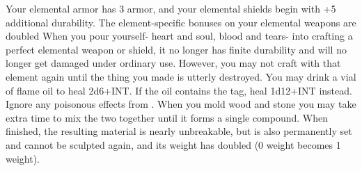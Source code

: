 \documentclass[darkmode]{dw_playbook}
\begin{document}
    {
            {Your elemental armor has 3 armor, and your elemental shields begin with +5 additional durability.}
        \gap
            {The element-specific bonuses on your elemental weapons are doubled}
        \gap
            {When you pour yourself- heart and soul, blood and tears- into crafting a perfect elemental weapon or shield, it no longer has finite durability and will no longer get damaged under ordinary use.  However, you may not craft with that element again until the thing you made is utterly destroyed.}
            {
            You may drink a vial of flame oil to heal 2d6+INT.  If the oil contains the  tag, heal 1d12+INT instead.  Ignore any poisonous effects from .}
        \gap
            {
            When you mold wood and stone you may take extra time to mix the two together until it forms a single compound.  When finished, the resulting material is nearly unbreakable, but is also permanently set and cannot be sculpted again, and its weight has doubled (0 weight becomes 1 weight).}
    }

\clearpage
~
\end{document}
